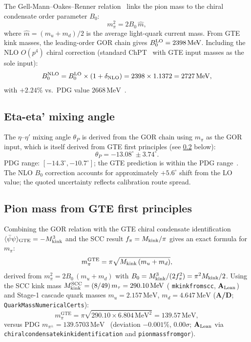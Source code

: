 \documentclass[11pt]{article}
\theoremstyle{remark}
\newcommand{\GTE}{\text{GTE}}
\newcommand{\lean}[1]{%
  \penalty-100
  \begingroup\def\_{\textunderscore\allowbreak}\texttt{#1}\endgroup}
\newcommand{\CatAL}{\ensuremath{\textbf{A}_{\rm Lean}}}
\newcommand{\CatAD}{\textbf{A/D}}
\begin{document}
The Gell-Mann--Oakes--Renner relation~\cite{GellMannOakesRenner1968} links the pion mass to the chiral
condensate order parameter $B_0$:
\begin{equation}
  m_\pi^2 = 2 B_0\,\hat{m},
  \label{eq:gor}
\end{equation}
where $\hat{m} = (m_u + m_d)/2$ is the average light-quark current mass.
From GTE kink masses, the leading-order GOR chain gives
$B_0^{\rm LO} = 2398\,\mathrm{MeV}$.
Including the NLO $O(p^4)$ chiral correction (standard ChPT~\cite{GasserLeutwyler1984,GasserLeutwyler1985} with GTE input
masses as the sole input):
\begin{equation}
  B_0^{\rm NLO} = B_0^{\rm LO} \times (1 + \delta_{\rm NLO})
    = 2398 \times 1.1372 = 2727\,\mathrm{MeV},
  \label{eq:b0nlo}
\end{equation}
with $+2.24\%$ vs.\ PDG value $2668\,\mathrm{MeV}$~\cite{PDG2022}.

\subsection{Eta-eta' mixing angle}
\label{ssec:thetap}

The $\eta$--$\eta'$ mixing angle $\theta_P$ is derived from the GOR chain
using $m_\pi$ as the GOR input, which is itself derived from GTE first
principles (see \cref{ssec:pimassfp} below):
\begin{equation}
  \theta_P = -13.08^\circ \pm 3.74^\circ.
  \label{eq:thetap}
\end{equation}
PDG range: $[-14.3^\circ, -10.7^\circ]$; the GTE prediction is within the
PDG range~\cite{PDG2022}.
The NLO $B_0$ correction accounts for approximately $+5.6^\circ$ shift from
the LO value; the quoted uncertainty reflects calibration route spread.

\subsection{Pion mass from GTE first principles}
\label{ssec:pimassfp}

Combining the GOR relation with the GTE chiral condensate identification
$\langle\bar\psi\psi\rangle_{\rm GTE} = -M_{\rm kink}^3$ and the SCC result
$f_\pi = M_{\rm kink}/\pi$ gives an exact formula for $m_\pi$:
\begin{equation}
  m_\pi^{\GTE} = \pi\sqrt{M_{\rm kink}\,(m_u + m_d)},
  \label{eq:pimassfp}
\end{equation}
derived from $m_\pi^2 = 2B_0\,(m_u+m_d)$ with $B_0 = M_{\rm kink}^3/(2f_\pi^2)
= \pi^2 M_{\rm kink}/2$.
Using the SCC kink mass $M_{\rm kink}^{\rm SCC} = (8/49)\,m_\tau = 290.10\,\mathrm{MeV}$
(\lean{mkink\_from\_scc}, $\CatAL$) and Stage-1 cascade quark masses
$m_u = 2.157\,\mathrm{MeV}$, $m_d = 4.647\,\mathrm{MeV}$ (\CatAD; \lean{QuarkMassNumericalCerts}):
\begin{equation}
  m_\pi^{\GTE} = \pi\sqrt{290.10 \times 6.804\,\mathrm{MeV}^2}
               = 139.57\,\mathrm{MeV},
  \label{eq:pimassval}
\end{equation}
versus PDG $m_{\pi^\pm} = 139.5703\,\mathrm{MeV}$~\cite{ParticleDataGroup2024}
(deviation $-0.001\%$, $0.00\sigma$; $\CatAL$ via
\lean{chiral\_condensate\_kink\_identification} and \lean{pion\_mass\_from\_gor}).
\end{document}
